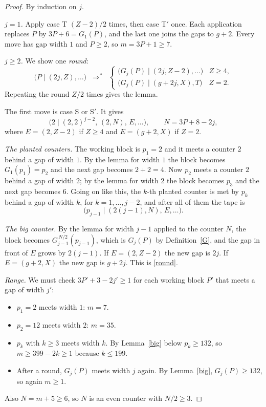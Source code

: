 \documentclass[11pt]{article}
\theoremstyle{definition}
\theoremstyle{remark}
\newcommand{\st}[2]{\bigl(#1 \mid #2\bigr)}
\newcommand{\too}{\;\Longrightarrow^{*}\;}
\begin{document}
\begin{proof}
By induction on $j$.

\emph{$j=1$.} Apply case T $(Z-2)/2$ times, then case T$'$ once. Each
application replaces $P$ by $3P+6=G_1(P)$, and the last one joins the gaps to
$g+2$. Every move has gap width $1$ and $P\ge 2$, so $m=3P+1\ge 7$.

\emph{$j\ge 2$.} We show one \emph{round}:
\begin{equation}\label{round}
\st{P}{(2j,Z),\dots}\;\too\;
\begin{cases}
\st{G_j(P)}{(2j,Z-2),\dots} & Z\ge 4,\\[2pt]
\st{G_j(P)}{(g+2j,X),T} & Z=2.
\end{cases}
\end{equation}
Repeating the round $Z/2$ times gives the lemma.

The first move is case S or S$'$. It gives
\[
\st{2}{(2,2)^{j-2},\,(2,N),\,E,\dots},\qquad N=3P+8-2j,
\]
where $E=(2,Z-2)$ if $Z\ge 4$ and $E=(g+2,X)$ if $Z=2$.

\emph{The planted counters.} The working block is $p_1=2$ and it meets a
counter $2$ behind a gap of width $1$. By the lemma for width $1$ the block
becomes $G_1(p_1)=p_2$ and the next gap becomes $2+2=4$. Now $p_2$ meets a
counter $2$ behind a gap of width $2$; by the lemma for width $2$ the block
becomes $p_3$ and the next gap becomes $6$. Going on like this, the $k$-th
planted counter is met by $p_k$ behind a gap of width $k$, for $k=1,\dots,j-2$,
and after all of them the tape is
\[
\st{p_{j-1}}{(2(j-1),N),\,E,\dots} .
\]

\emph{The big counter.} By the lemma for width $j-1$ applied to the counter $N$,
the block becomes $G_{j-1}^{\,N/2}(p_{j-1})$, which is $G_j(P)$ by
Definition~\ref{G}, and the gap in front of $E$ grows by $2(j-1)$. If
$E=(2,Z-2)$ the new gap is $2j$. If $E=(g+2,X)$ the new gap is $g+2j$. This is
\eqref{round}.

\emph{Range.} We must check $3P'+3-2j'\ge 1$ for each working block $P'$ that
meets a gap of width $j'$:
\begin{itemize}
\item $p_1=2$ meets width $1$: $m=7$.
\item $p_2=12$ meets width $2$: $m=35$.
\item $p_k$ with $k\ge 3$ meets width $k$. By Lemma~\ref{big} below
$p_k\ge 132$, so $m\ge 399-2k\ge 1$ because $k\le 199$.
\item After a round, $G_j(P)$ meets width $j$ again. By Lemma~\ref{big},
$G_j(P)\ge 132$, so again $m\ge 1$.
\end{itemize}
Also $N=m+5\ge 6$, so $N$ is an even counter with $N/2\ge 3$.
\end{proof}
\end{document}
